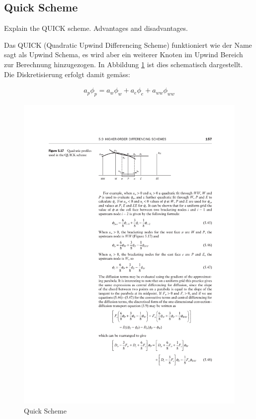 \documentclass[a4paper]{scrartcl}
\begin{document}
\subsection{Quick Scheme} Explain the QUICK scheme. Advantages and
disadvantages.

Das QUICK (Quadratic Upwind Differencing Scheme) funktioniert wie der Name sagt
als Upwind Schema, es wird aber ein weiterer Knoten im Upwind Bereich
zur Berechnung hinzugezogen. In Abbildung \ref{fig:56} ist dies schematisch
dargestellt. Die Diskretisierung erfolgt damit gemäss:

\begin{align}
\boxed{a_p\phi_p=a_w\phi_w+a_e\phi_e+a_{ww}\phi_{ww}}
\end{align}

\begin{figure}[h!]
\begin{center}
\includegraphics[scale=1.0]{images/56.pdf}
\caption{Quick Scheme}
\label{fig:56}
\end{center}
\end{figure}
\end{document}
